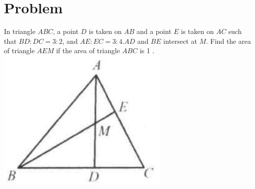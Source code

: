 \documentclass{article}
\begin{document}
\section*{Problem}
In triangle \(A B C\), a point \(D\) is taken on \(A B\) and a point \(E\) is taken on \(A C\) such that \(B D: D C=3: 2\), and \(A E: E C=3: 4 . A D\) and \(B E\) intersect at \(M\). Find the area of triangle \(A E M\) if the area of triangle \(A B C\) is 1 .\\
\centering
\includegraphics[width=\textwidth]{images/127(3).jpg}
\end{document}
